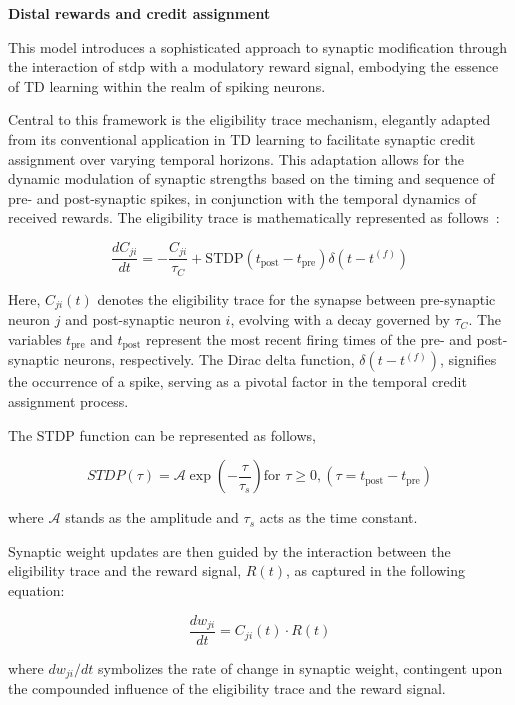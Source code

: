 \textbf{Distal rewards and credit assignment} 

This model introduces a sophisticated approach to synaptic modification through the interaction of \ac{stdp} with a modulatory reward signal, embodying the essence of TD learning within the realm of spiking neurons.


Central to this framework is the eligibility trace mechanism, elegantly adapted from its conventional application in TD learning to facilitate synaptic credit assignment over varying temporal horizons. This adaptation allows for the dynamic modulation of synaptic strengths based on the timing and sequence of pre- and post-synaptic spikes, in conjunction with the temporal dynamics of received rewards. The eligibility trace is mathematically represented as follows~\cite{Ch_1_R22}:

\begin{equation}
    \frac{dC_{ji}}{dt} = -\frac{C_{ji}}{\tau_{C}} + \text{STDP}(t_{\text{post}} - t_{\text{pre}})\delta(t - t^{(f)})
\end{equation}

Here, $C_{ji}(t)$ denotes the eligibility trace for the synapse between pre-synaptic neuron $j$ and post-synaptic neuron $i$, evolving with a decay governed by $\tau_{C}$. The variables $t_{\text{pre}}$ and $t_{\text{post}}$ represent the most recent firing times of the pre- and post-synaptic neurons, respectively. The Dirac delta function, $\delta(t - t^{(f)})$, signifies the occurrence of a spike, serving as a pivotal factor in the temporal credit assignment process. 

The STDP function can be represented as follows,

\begin{equation}
    STDP(\tau) = \mathcal{A} \exp\left(-\frac{\tau}{\tau_{s}}\right) \text{for \(\tau \geq 0\)}, (\tau = t_{\text{post}} - t_{\text{pre}})
\end{equation}

\noindent where \(\mathcal{A}\) stands as the amplitude and \(\tau_{s}\) acts as the time constant.

Synaptic weight updates are then guided by the interaction between the eligibility trace and the reward signal, $R(t)$, as captured in the following equation:

\begin{equation}
    \frac{dw_{ji}}{dt} = C_{ji}(t) \cdot R(t)
\end{equation}

\noindent where $dw_{ji}/dt$ symbolizes the rate of change in synaptic weight, contingent upon the compounded influence of the eligibility trace and the reward signal.

